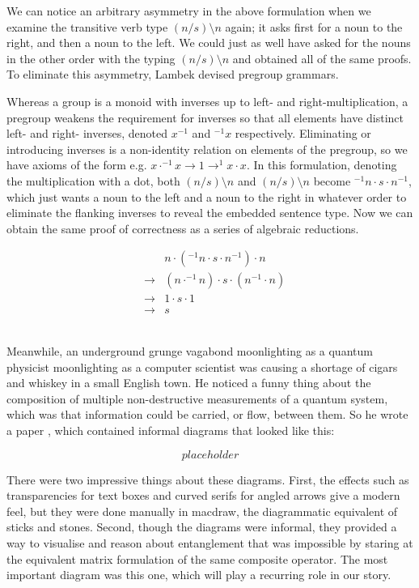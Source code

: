 \begin{fullwidth}
We can notice an arbitrary asymmetry in the above formulation when we examine the transitive verb type $(n/s)\setminus n$ again; it asks first for a noun to the right, and then a noun to the left. We could just as well have asked for the nouns in the other order with the typing $(n/s)\setminus n$ and obtained all of the same proofs. To eliminate this asymmetry, Lambek devised pregroup grammars.

Whereas a group is a monoid with inverses up to left- and right-multiplication, a pregroup weakens the requirement for inverses so that all elements have distinct left- and right- inverses, denoted $x^{-1}$ and $^{-1}x$ respectively. Eliminating or introducing inverses is a non-identity relation on elements of the pregroup, so we have axioms of the form e.g. $x \cdot ^{-1}x \rightarrow 1 \rightarrow ^{1}x \cdot x$. In this formulation, denoting the multiplication with a dot, both $(n/s)\setminus n$ and $(n/s)\setminus n$ become $^{-1}n \cdot s \cdot n^{-1}$, which just wants a noun to the left and a noun to the right in whatever order to eliminate the flanking inverses to reveal the embedded sentence type. Now we can obtain the same proof of correctness as a series of algebraic reductions.

\begin{align}
& &n \cdot (^{-1}n \cdot s \cdot n^{-1}) \cdot n\\
&\rightarrow &(n \cdot ^{-1}n) \cdot s \cdot (n^{-1} \cdot n)\\
&\rightarrow & 1 \cdot s \cdot 1\\
&\rightarrow & s
\end{align}

\\

Meanwhile, an underground grunge vagabond moonlighting as a quantum physicist moonlighting as a computer scientist was causing a shortage of cigars and whiskey in a small English town. He noticed a funny thing about the composition of multiple non-destructive measurements of a quantum system, which was that information could be carried, or flow, between them. So he wrote a paper \citep{}, which contained informal diagrams that looked like this:

\[placeholder\]

There were two impressive things about these diagrams. First, the effects such as transparencies for text boxes and curved serifs for angled arrows give a modern feel, but they were done manually in macdraw, the diagrammatic equivalent of sticks and stones. Second, though the diagrams were informal, they provided a way to visualise and reason about entanglement that was impossible by staring at the equivalent matrix formulation of the same composite operator. The most important diagram was this one, which will play a recurring role in our story.


\end{fullwidth}
